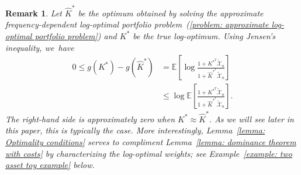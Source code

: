 \documentclass[10pt]{article} %
\newtheorem{remark}{Remark}[section]
\begin{document}
	\begin{remark} \rm \label{rmk:approx K* is close to true K*}
		Let $\widehat{K}^*$ be the optimum obtained by solving the approximate frequency-dependent log-optimal portfolio problem~(\ref{problem: approximate log-optimal portfolio problem}) and $K^*$ be the true log-optimum. Using Jensen's inequality, we~have 
		\begin{align*}
			0 \leq g(K^*) - g(\widehat{K}^*) 
			&=  \mathbb{E} \left[ \log \frac{1+K^{*^T} \widetilde{ \mathcal{X} }_n }{1 + \widehat{K}^{*^T} \widetilde{ \mathcal{X} }_n }\right]\\
			& \leq \log \mathbb{E} \left[  \frac{1+K^{*^T} \widetilde{ \mathcal{X} }_n }{1 + \widehat{K}^{*^T} \widetilde{ \mathcal{X} }_n }\right].
		\end{align*}
		The right-hand side is approximately zero when $K^* \approx \widehat{K}^*$. As we will see later in this paper, this is typically the case. 
		More interestingly, Lemma~\ref{lemma: Optimality conditions} serves to compliment Lemma~\ref{lemma: dominance theorem with costs} by characterizing the log-optimal weights; see Example~\ref{example: two asset toy example} below. 
	\end{remark}
	
\end{document}
